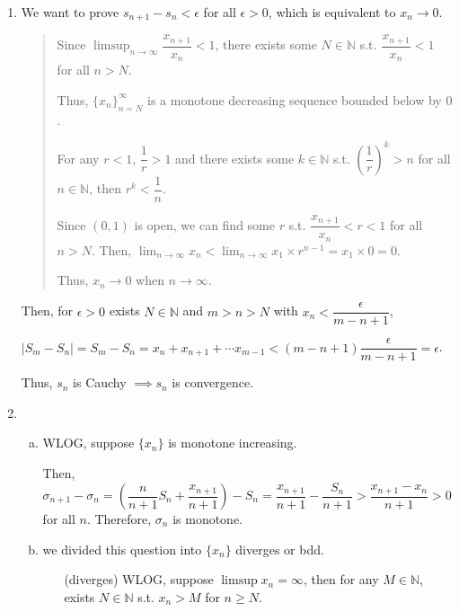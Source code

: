 \documentclass[12pt]{article}
\begin{document}
\begin{enumerate}
    \item We want to prove $s_{n+1} - s_n < \epsilon$ for all $\epsilon > 0$, which is equivalent to $x_n \to 0$.
    \begin{quote}
        Since $\displaystyle\limsup_{n \to \infty} \dfrac{x_{n+1}}{x_n} < 1$, 
        there exists some $N\in \mathbb{N}$ s.t. $\dfrac{x_{n+1}}{x_n} < 1$ for all $n > N$.

        Thus, $\lbrace x_n\rbrace_{n = N}^\infty$ is a monotone decreasing sequence bounded below by $0$.

        For any $r < 1$, $\dfrac{1}{r} > 1$ and there exists some $k \in \mathbb{N}$ s.t. $(\dfrac{1}{r})^k > n$ for all $n\in \mathbb{N}$,
        then $r^k < \dfrac{1}{n}$. 
        
        Since $(0, 1)$ is open, we can find some $r$ s.t.  $\dfrac{x_{n+1}}{x_n} < r < 1$ for all $n > N$. 
        Then, $\displaystyle\lim_{n\to \infty} x_n < \displaystyle\lim_{n\to\infty} x_1\times r^{n-1} = x_1 \times 0 = 0$.

        Thus, $x_n \to 0$ when $n \to \infty$.
    \end{quote}

    \newpage
    Then, for $\epsilon > 0$  exists $N \in \mathbb{N}$ and $m > n > N$ with $x_n < \dfrac{\epsilon}{m-n+1}$, 
    
    $|S_m - S_n| = S_m - S_n = x_n + x_{n+1} + \cdots x_{m-1} < (m-n+1)\dfrac{\epsilon}{m-n+1} = \epsilon$.
    
    Thus, $s_n$ is Cauchy $\implies s_n$ is convergence.
    
    \item \begin{enumerate}[(a)]
        \item WLOG, suppose $\lbrace x_n \rbrace$ is monotone increasing.
        
        Then, $\sigma_{n+1} - \sigma_n = (\dfrac{n}{n+1} S_n + \dfrac{x_{n+1}}{n+1}) - S_n = \dfrac{x_{n+1}}{n+1} - \dfrac{S_n}{n+1} > \dfrac{x_{n+1}-x_n}{n+1} > 0$ for all $n$.
        Therefore, $\sigma_n$ is monotone.

        \item we divided this question into $\lbrace x_n\rbrace$ diverges or bdd.
        
        \begin{enumerate}
            \item[(diverges)] WLOG, suppose $\limsup x_n = \infty$, then for any $M\in \mathbb{N}$, exists $N \in \mathbb{N}$ s.t. $x_n > M$ for $n \geq N$.
            

\end{enumerate}
\end{enumerate}
\end{enumerate}
\end{document}
